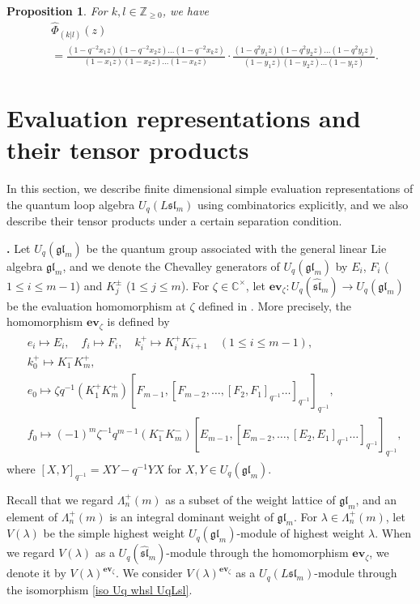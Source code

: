 \documentclass[12pt]{amsart}
\newtheorem{prop}[thm]{Proposition}
\def \para{\refstepcounter{thm} \par\medskip\noindent
                \textbf{\thethm .} }
\numberwithin{equation}{thm}
\newcommand\CC{\mathbb C}
\newcommand\ZZ{\mathbb Z}
\newcommand\z{\zeta}
\newcommand\la{\lambda}
\newcommand\vL{\varLambda}
\newcommand\wh{\widehat}
\newcommand\ra{\rightarrow}
\newcommand\Fgl{\mathfrak{gl}}
\newcommand\Fsl{\mathfrak{sl}}
\newcommand\ev{\mathbf{{ev}}}
\newcounter{ni}
\begin{document}
\begin{prop}
\label{Prop whPhiklz}
For $k,l \in \ZZ_{\geq 0}$, we have 
\begin{align*}
&\wh{\Phi}_{(k|l)} (z) 
\\
&=\frac{ (1- q^{-2} x_1 z) (1- q^{-2} x_2 z) \dots ( 1 - q^{-2} x_k z)}{ (1- x_1 z) (1 - x_2 z) \dots (1 - x_k z)} 
	\cdot 
	\frac{ ( 1- q^2 y_1 z) ( 1- q^2 y_2 z) \dots (1 - q^2 y_l z)}{ (1- y_1 z) (1 - y_2 z) \dots (1 - y_l z)}.
\end{align*}
\end{prop}


\section{Evaluation representations and their tensor products} 
In this section, we describe finite dimensional simple evaluation representations of the quantum loop algebra $U_q (L \Fsl_m)$ 
using combinatorics explicitly, 
and we also describe their tensor products under a certain separation condition. 

\para 
Let $U_q (\Fgl_m)$ be the quantum group associated with the general linear Lie algebra $\Fgl_m$, 
and we denote the Chevalley generators of $U_q (\Fgl_m)$ by $E_i$, $F_i$ ($1 \leq i \leq m-1$) and $K_j^{\pm}$ ($1 \leq j \leq m$).  
For $\z \in \CC^{\times} $, 
let $\ev_{\z} : U_q (\wh{\Fsl}_m) \ra U_q (\Fgl_m)$ be the evaluation homomorphism at $\z$ defined in \cite{Jim86}. 
More precisely, the homomorphism $\ev_{\z}$ is defined by 
\begin{align*}
\begin{split} 
& e_i \mapsto E_i, \quad f_i \mapsto F_i, \quad k_i^+ \mapsto K_i^+ K_{i+1}^- \quad (1 \leq i \leq m-1), 
\\
& k_0^+ \mapsto K_1^- K_m^+, 
\\
& e_0 \mapsto \z q^{-1} (K_1^+ K_m^+) [F_{m-1}, [F_{m-2}, \dots, [F_2, F_1]_{q^{-1}} \dots ]_{q^{-1}} ]_{q^{-1}}, 
\\
& f_0 \mapsto (-1)^m \z^{-1} q^{m-1} (K_1^- K_m^-) [E_{m-1}, [E_{m-2}, \dots, [E_2,E_1]_{q^{-1}} \dots ]_{q^{-1}}]_{q^{-1}}, 
\end{split} 
\end{align*}
where $[X,Y]_{q^{-1}} = XY - q^{-1} YX$ for $X,Y \in U_q (\Fgl_m)$. 

Recall that we regard $\vL_n^+(m)$ as a subset of the weight lattice of $\Fgl_m$, 
and an element of $\vL_n^+(m)$ is an integral dominant weight of $\Fgl_m$.  
For $\la \in \vL_n^+(m)$, let $V (\la)$ be the simple highest weight $U_q (\Fgl_m)$-module of highest weight $\la$. 
When we regard $V(\la)$ as a $U_q (\wh{\Fsl}_m)$-module through the homomorphism $\ev_{\z}$, 
we denote it by $V(\la)^{\ev_{\z}}$. 
We consider $V(\la)^{\ev_{\z}}$ as a $U_q (L\Fsl_m)$-module through the isomorphism \eqref{iso Uq whsl UqLsl}. 
\end{document}
